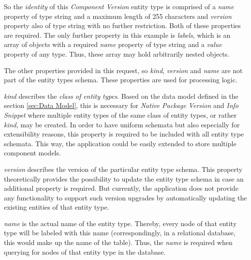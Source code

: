 So the \emph{identity} of this \emph{Component Version} entity type is comprised of a \emph{name} property of type string and a maximum length of 255 characters and \emph{version} property also of type string with no further restriction. Both of these properties are required. The only further property in this example is \emph{labels}, which is an array of objects with a required \emph{name} property of type string and a \emph{value} property of any type. Thus, these array may hold arbitrarily nested objects.\par 
The other properties provided in this request, so \emph{kind}, \emph{version} and \emph{name} are not part of the entity types schema. These properties are used for processing logic.\par \emph{kind} describes the \emph{class of entity types}. Based on the data model defined in the section \ref{sec:Data Model}, this is necessary for \emph{Native Package Version} and \emph{Info Snippet} where multiple entity types of the same class of entity types, or rather \emph{kind}, may be created. In order to have uniform schemata but also especially for extensibility reasons, this property is required to be included with all entity type schemata. This way, the application could be easily extended to store multiple component models.\par 
\emph{version} describes the version of the particular entity type schema. This property theoretically provides the possibility to update the entity type schema in case an additional property is required. But currently, the application does not provide any functionality to support such version upgrades by automatically updating the existing entities of that entity type.\par 
\emph{name} is the actual name of the entity type. Thereby, every node of that entity type will be labeled with this name (correspondingly, in a relational database, this would make up the name of the table). Thus, the \emph{name} is required when querying for nodes of that entity type in the database.\\

